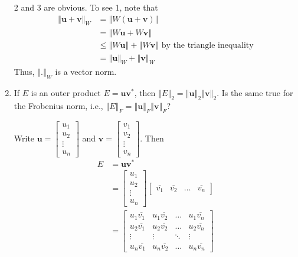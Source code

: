 \begin{enumerate}
\begin{solution}
    2 and 3 are obvious. To see 1, note that 
    \begin{align*}\left\Vert\mathbf{u} + \mathbf{v}\right\Vert_W
        &=    \left\Vert W\left(\mathbf{u} + \mathbf{v}\right)\right\Vert\\
        &=    \left\Vert W\mathbf{u} + W\mathbf{v}\right\Vert\\
        &\leq \left\Vert W\mathbf{u}\right\Vert + \left\Vert W\mathbf{v}\right\Vert\text{ by the triangle inequality}\\
        &=    \left\Vert \mathbf{u}\right\Vert_W + \left\Vert \mathbf{v}\right\Vert_W
    \end{align*}
    Thus, \(\left\Vert.\right\Vert_W\) is a vector norm.
\end{solution}
\item If \(E\) is an outer product \(E=\mathbf{u}\mathbf{v}^*\), then \(\left\Vert E \right\Vert_2 = \left\Vert \mathbf{u} \right\Vert_2 \left\Vert \mathbf{v} \right\Vert_2\). Is the same true for the Frobenius norm, i.e., \(\left\Vert E \right\Vert_F=\left\Vert \mathbf{u} \right\Vert_F \left\Vert \mathbf{v} \right\Vert_F\)?
\begin{solution}
Write \(\mathbf{u}=\begin{bmatrix}u_1 \\ u_2 \\ \vdots \\ u_n\end{bmatrix}\) and \(\mathbf{v}=\begin{bmatrix}v_1 \\ v_2 \\ \vdots \\ v_n\end{bmatrix}\). Then \begin{align*}E
    &= \mathbf{u}\mathbf{v}^*\\
    &= \begin{bmatrix}u_1 \\ u_2 \\ \vdots \\ u_n\end{bmatrix} \begin{bmatrix}\overline{v_1} & \overline{v_2} & \hdots & \overline{v_n}\end{bmatrix}\\
    &= \begin{bmatrix}u_1\overline{v_1} & u_1\overline{v_2} & \hdots & u_1\overline{v_n}\\u_2\overline{v_1} & u_2\overline{v_2} & \hdots & u_2\overline{v_n}\\\vdots & \vdots & \ddots & \vdots \\ u_n\overline{v_1} & u_n\overline{v_2} & \hdots & u_n\overline{v_n}\end{bmatrix}

\end{align*}
\end{solution}
\end{enumerate}
